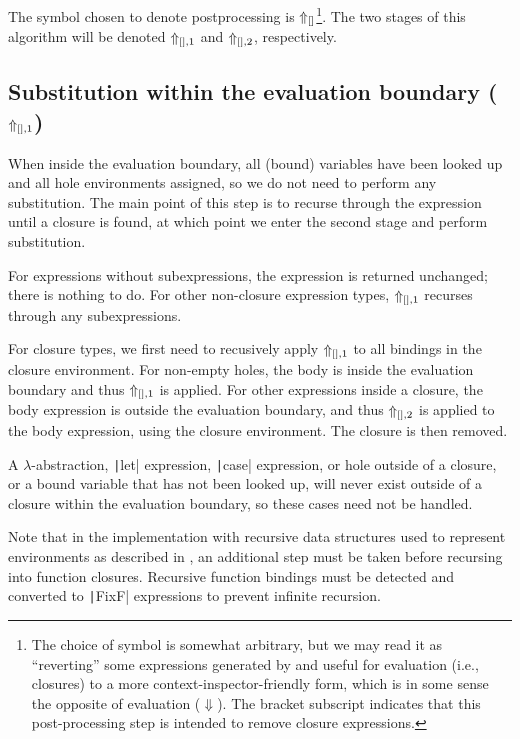 The symbol chosen to denote postprocessing is $\Uparrow_{[]}$\footnote{The choice of symbol is somewhat arbitrary, but we may read it as ``reverting'' some expressions generated by and useful for evaluation (i.e., closures) to a more context-inspector-friendly form, which is in some sense the opposite of evaluation ($\Downarrow$). The bracket subscript indicates that this post-processing step is intended to remove closure expressions.}. The two stages of this algorithm will be denoted $\Uparrow_{[],1}$ and $\Uparrow_{[],2}$, respectively.

\subsection{Substitution within the evaluation boundary ($\Uparrow_{[],1}$)}
\label{sec:postprocessing-subst-inside}

When inside the evaluation boundary, all (bound) variables have been looked up and all hole environments assigned, so we do not need to perform any substitution. The main point of this step is to recurse through the expression until a closure is found, at which point we enter the second stage and perform substitution.

For expressions without subexpressions, the expression is returned unchanged; there is nothing to do. For other non-closure expression types, $\Uparrow_{[],1}$ recurses through any subexpressions.

For closure types, we first need to recusively apply $\Uparrow_{[],1}$ to all bindings in the closure environment. For non-empty holes, the body is inside the evaluation boundary and thus $\Uparrow_{[],1}$ is applied. For other expressions inside a closure, the body expression is outside the evaluation boundary, and thus $\Uparrow_{[],2}$ is applied to the body expression, using the closure environment. The closure is then removed.

A $\lambda$-abstraction, \texttt|let| expression, \texttt|case| expression, or hole outside of a closure, or a bound variable that has not been looked up, will never exist outside of a closure within the evaluation boundary, so these cases need not be handled.

Note that in the implementation with recursive data structures used to represent environments as described in , an additional step must be taken before recursing into function closures. Recursive function bindings must be detected and converted to \texttt|FixF| expressions to prevent infinite recursion.

